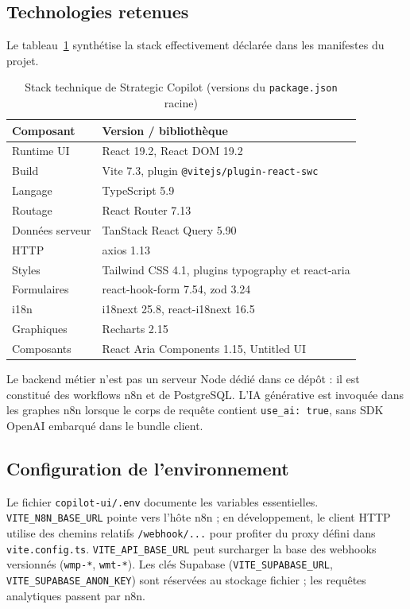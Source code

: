 \subsection{Technologies retenues}

Le tableau~\ref{tab:stack-ch5} synthétise la stack effectivement déclarée dans les manifestes du projet.

\begin{table}[htbp]
\centering
\caption{Stack technique de Strategic Copilot (versions du \texttt{package.json} racine)}
\label{tab:stack-ch5}
\begin{tabular}{@{}ll@{}}
\toprule
\textbf{Composant} & \textbf{Version / bibliothèque} \\
\midrule
Runtime UI & React 19.2, React DOM 19.2 \\
Build & Vite 7.3, plugin \texttt{@vitejs/plugin-react-swc} \\
Langage & TypeScript 5.9 \\
Routage & React Router 7.13 \\
Données serveur & TanStack React Query 5.90 \\
HTTP & axios 1.13 \\
Styles & Tailwind CSS 4.1, plugins typography et react-aria \\
Formulaires & react-hook-form 7.54, zod 3.24 \\
i18n & i18next 25.8, react-i18next 16.5 \\
Graphiques & Recharts 2.15 \\
Composants & React Aria Components 1.15, Untitled UI \\
\bottomrule
\end{tabular}
\end{table}

Le backend métier n'est pas un serveur Node dédié dans ce dépôt : il est constitué des workflows n8n et de PostgreSQL. L'IA générative est invoquée dans les graphes n8n lorsque le corps de requête contient \texttt{use\_ai: true}, sans SDK OpenAI embarqué dans le bundle client.

\subsection{Configuration de l'environnement}

Le fichier \texttt{copilot-ui/.env} documente les variables essentielles. \texttt{VITE\_N8N\_BASE\_URL} pointe vers l'hôte n8n ; en développement, le client HTTP utilise des chemins relatifs \texttt{/webhook/...} pour profiter du proxy défini dans \texttt{vite.config.ts}. \texttt{VITE\_API\_BASE\_URL} peut surcharger la base des webhooks versionnés (\texttt{wmp-*}, \texttt{wmt-*}). Les clés Supabase (\texttt{VITE\_SUPABASE\_URL}, \texttt{VITE\_SUPABASE\_ANON\_KEY}) sont réservées au stockage fichier ; les requêtes analytiques passent par n8n.

